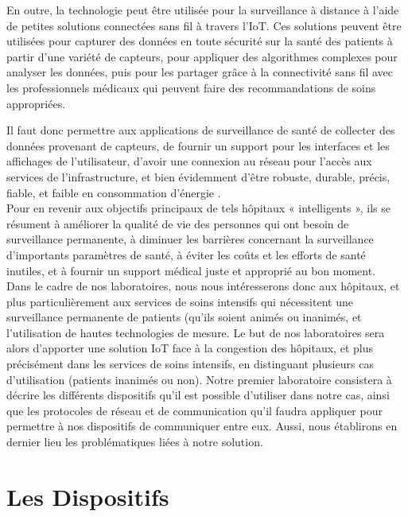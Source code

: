 \documentclass{article}
\begin{document}
En outre, la technologie peut être utilisée pour la surveillance à distance à l'aide de petites solutions connectées sans fil à travers l'IoT. Ces solutions peuvent être utilisées pour capturer des données en toute sécurité sur la santé des patients à partir d'une variété de capteurs, pour appliquer des algorithmes complexes pour analyser les données, puis pour les partager grâce à la connectivité sans fil avec les professionnels médicaux qui peuvent faire des recommandations de soins appropriées.

Il faut donc permettre aux applications de surveillance de santé de collecter des données provenant de capteurs, de fournir un support pour les interfaces et les affichages de l’utilisateur, d’avoir une connexion au réseau pour l’accès aux services de l’infrastructure, et bien évidemment d’être robuste, durable, précis, fiable, et faible en consommation d’énergie \cite{vermesan2014internet}.
\\

Pour en revenir aux objectifs principaux de tels hôpitaux « intelligents », ils se résument à améliorer la qualité de vie des personnes qui ont besoin de surveillance permanente, à diminuer les barrières concernant la surveillance d’importants paramètres de santé, à éviter les coûts et les efforts de santé inutiles, et à fournir un support médical juste et approprié au bon moment.
\\

Dans le cadre de nos laboratoires, nous nous intéresserons donc aux hôpitaux, et plus particulièrement aux services de soins intensifs qui nécessitent une surveillance permanente de patients (qu’ils soient animés ou inanimés, et l’utilisation de hautes technologies de mesure. Le but de nos laboratoires sera alors d’apporter une solution IoT face à la congestion des hôpitaux, et plus précisément dans les services de soins intensifs, en distinguant plusieurs cas d’utilisation (patients inanimés ou non). Notre premier laboratoire consistera à décrire les différents dispositifs qu’il est possible d’utiliser dans notre cas, ainsi que les protocoles de réseau et de communication qu’il faudra appliquer pour permettre à nos dispositifs de communiquer entre eux. Aussi, nous établirons en dernier lieu les problématiques liées à notre solution. 

\section{Les Dispositifs}
\end{document}

